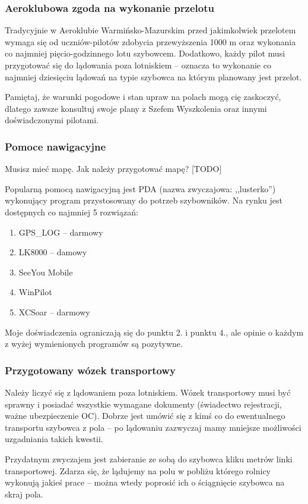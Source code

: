 \documentclass{article}
\begin{document}
\subsubsection{Aeroklubowa zgoda na wykonanie przelotu}
Tradycyjnie w Aeroklubie Warmińsko-Mazurskim przed jakimkolwiek przelotem
wymaga się od uczniów-pilotów zdobycia przewyższenia 1000 m oraz wykonania
co najmniej pięcio-godzinnego lotu szybowcem. Dodatkowo, każdy pilot musi
przygotować się do lądowania poza lotniskiem -- oznacza to wykonanie co
najmniej dziesięciu lądowań na typie szybowca na którym planowany jest
przelot.

Pamiętaj, że warunki pogodowe i stan upraw na polach mogą cię zaskoczyć,
dlatego zawsze konsultuj swoje plany z Szefem Wyszkolenia oraz innymi
doświadczonymi pilotami.

\subsubsection{Pomoce nawigacyjne}
Musisz mieć mapę. Jak należy przygotować mapę?
[TODO] %

Popularną pomocą nawigacyjną jest PDA (nazwa zwyczajowa: ,,lusterko'') 
wykonujący program przystosowany
do potrzeb szybowników. Na rynku jest dostępnych co najmniej 5
rozwiązań:
\begin{enumerate}
\item GPS\_LOG -- darmowy
\item LK8000 -- damowy
\item SeeYou Mobile
\item WinPilot
\item XCSoar -- darmowy
\end{enumerate}
Moje doświadczenia ograniczają się do punktu 2. i punktu 4., ale
opinie o każdym z wyżej wymienionych programów są pozytywne.

\subsubsection{Przygotowany wózek transportowy}
Należy liczyć się z lądowaniem poza lotniskiem. 
Wózek transportowy musi być sprawny i posiadać wszystkie wymagane
dokumenty (świadectwo rejestracji, ważne ubezpieczenie OC). Dobrze jest
umówić się z kimś co do ewentualnego transportu szybowca z pola -- po
lądowaniu zazwyczaj mamy mniejsze możliwości uzgadniania takich kwestii.

Przydatnym zwyczajem jest zabieranie ze sobą do szybowca kliku metrów
linki transportowej. Zdarza się, że lądujemy na polu w pobliżu którego
rolnicy wykonują jakieś prace -- można wtedy poprosić ich o ściągnięcie
szybowca na skraj pola.
\end{document}
